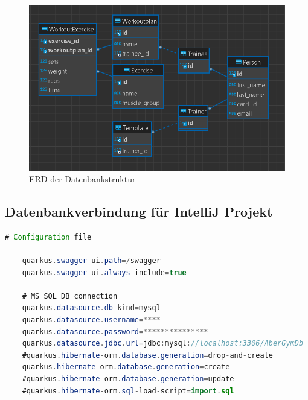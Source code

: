 \begin{figure}[!htb]
    \centering
    \includegraphics[width=1\textwidth]{pics/erd.png}
    \caption{ERD der Datenbankstruktur}
    \label{fig:erd}
\end{figure}
\newpage

\subsection{Datenbankverbindung für IntelliJ Projekt}
\begin{lstlisting}[language=Java,caption=Datenbank verbindung,label=lst:impl:foo]
    # Configuration file

    quarkus.swagger-ui.path=/swagger
    quarkus.swagger-ui.always-include=true
    
    # MS SQL DB connection
    quarkus.datasource.db-kind=mysql
    quarkus.datasource.username=****
    quarkus.datasource.password=***************
    quarkus.datasource.jdbc.url=jdbc:mysql://localhost:3306/AberGymDb
    #quarkus.hibernate-orm.database.generation=drop-and-create
    quarkus.hibernate-orm.database.generation=create
    #quarkus.hibernate-orm.database.generation=update
    #quarkus.hibernate-orm.sql-load-script=import.sql
\end{lstlisting}

